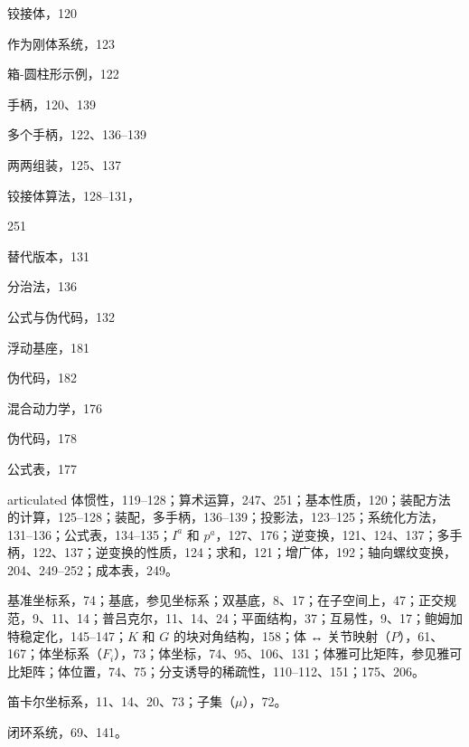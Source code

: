 \documentclass[10pt,a4paper]{book}
\theoremstyle{thmstyle} %
\theoremstyle{defstyle} %
\theoremstyle{prostyle} %
\begin{document}
铰接体，120



作为刚体系统，123



箱-圆柱形示例，122



手柄，120、139



多个手柄，122、136–139



两两组装，125、137



铰接体算法，128–131，



251



替代版本，131



分治法，136



公式与伪代码，132



浮动基座，181



伪代码，182



混合动力学，176



伪代码，178



公式表，177



 articulated 体惯性，119–128；算术运算，247、251；基本性质，120；装配方法的计算，125–128；装配，多手柄，136–139；投影法，123–125；系统化方法，131–136；公式表，134–135；$I^{a}$ 和 $p^{a}$，127、176；逆变换，121、124、137；多手柄，122、137；逆变换的性质，124；求和，121；增广体，192；轴向螺纹变换，204、249–252；成本表，249。



基准坐标系，74；基底，参见坐标系；双基底，8、17；在子空间上，47；正交规范，9、11、14；普吕克尔，11、14、24；平面结构，37；互易性，9、17；鲍姆加特稳定化，145–147；$K$ 和 $G$ 的块对角结构，158；体 ↔ 关节映射（$P$），61、167；体坐标系（$F_{i}$），73；体坐标，74、95、106、131；体雅可比矩阵，参见雅可比矩阵；体位置，74、75；分支诱导的稀疏性，110–112、151；175、206。



笛卡尔坐标系，11、14、20、73；子集（$\mu$），72。



闭环系统，69、141。
\end{document}
